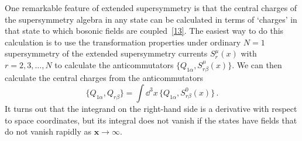 One remarkable feature of extended supersymmetry is that the central charges
of the supersymmetry algebra in any state can be calculated in terms of
`charges' in that state to which bosonic fields are
coupled~\hyperref[ch27-ref-13]{[13]}. The easiest way to do this calculation
is to use the transformation properties under ordinary \(N=1\)
supersymmetry of the extended supersymmetry currents \(S_r^\mu(x)\) with
\(r=2,3,\ldots,N\) to calculate the anticommutators
\(\{Q_{1\alpha},S_{r\beta}^\mu(x)\}\). We can then calculate the central
charges from the anticommutators
\begin{equation}
  \{Q_{1\alpha},Q_{r\beta}\}
  =\int \dd^3x\,\{Q_{1\alpha},S_{r\beta}^0(x)\}\,.
  \tag{27.9.12}\label{eq:27.9.12}
\end{equation}
It turns out that the integrand on the right-hand side is a derivative with
respect to space coordinates, but its integral does not vanish if the states
have fields that do not vanish rapidly as \(\mathbf{x}\longrightarrow\infty\).

